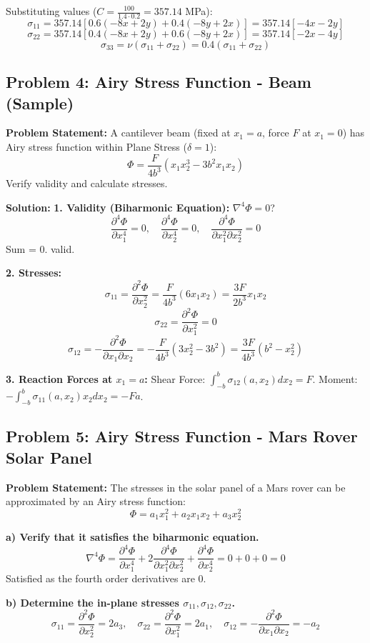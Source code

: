 \documentclass[10pt,twocolumn, a4paper]{article}
\begin{document}
Substituting values ($C = \frac{100}{1.4 \cdot 0.2} = 357.14$ MPa):
\[ \sigma_{11} = 357.14 [0.6(-8x+2y) + 0.4(-8y+2x)] = 357.14 [-4x - 2y] \]
\[ \sigma_{22} = 357.14 [0.4(-8x+2y) + 0.6(-8y+2x)] = 357.14 [-2x - 4y] \]
\[ \sigma_{33} = \nu(\sigma_{11} + \sigma_{22}) = 0.4(\sigma_{11} + \sigma_{22}) \]

\subsection{Problem 4: Airy Stress Function - Beam (Sample)}
\textbf{Problem Statement:}
A cantilever beam (fixed at $x_1=a$, force $F$ at $x_1=0$) has Airy stress function within Plane Stress ($\delta=1$):
\[ \Phi = \frac{F}{4b^3} (x_1 x_2^3 - 3b^2 x_1 x_2) \]
Verify validity and calculate stresses.

\textbf{Solution:}
\textbf{1. Validity (Biharmonic Equation):}
$\nabla^4 \Phi = 0$?
\[ \frac{\partial^4 \Phi}{\partial x_1^4} = 0, \quad \frac{\partial^4 \Phi}{\partial x_2^4} = 0, \quad \frac{\partial^4 \Phi}{\partial x_1^2 \partial x_2^2} = 0 \]
Sum = 0. valid.

\textbf{2. Stresses:}
\[ \sigma_{11} = \frac{\partial^2 \Phi}{\partial x_2^2} = \frac{F}{4b^3} (6x_1 x_2) = \frac{3F}{2b^3} x_1 x_2 \]
\[ \sigma_{22} = \frac{\partial^2 \Phi}{\partial x_1^2} = 0 \]
\[ \sigma_{12} = -\frac{\partial^2 \Phi}{\partial x_1 \partial x_2} = -\frac{F}{4b^3} (3x_2^2 - 3b^2) = \frac{3F}{4b^3} (b^2 - x_2^2) \]

\textbf{3. Reaction Forces at $x_1=a$:}
Shear Force: $\int_{-b}^{b} \sigma_{12}(a, x_2) dx_2 = F$.
Moment: $-\int_{-b}^{b} \sigma_{11}(a, x_2) x_2 dx_2 = -Fa$.

\subsection{Problem 5: Airy Stress Function - Mars Rover Solar Panel}
\textbf{Problem Statement:}
The stresses in the solar panel of a Mars rover can be approximated by an Airy stress function:
\[ \Phi = a_1 x_1^2 + a_2 x_1 x_2 + a_3 x_2^2 \]

\textbf{a) Verify that it satisfies the biharmonic equation.}
\[ \nabla^4 \Phi = \frac{\partial^4 \Phi}{\partial x_1^4} + 2\frac{\partial^4 \Phi}{\partial x_1^2 \partial x_2^2} + \frac{\partial^4 \Phi}{\partial x_2^4} = 0 + 0 + 0 = 0 \]
Satisfied as the fourth order derivatives are 0.

\textbf{b) Determine the in-plane stresses $\sigma_{11}, \sigma_{12}, \sigma_{22}$.}
\[ \sigma_{11} = \frac{\partial^2 \Phi}{\partial x_2^2} = 2a_3, \quad \sigma_{22} = \frac{\partial^2 \Phi}{\partial x_1^2} = 2a_1, \quad \sigma_{12} = -\frac{\partial^2 \Phi}{\partial x_1 \partial x_2} = -a_2 \]
\end{document}
